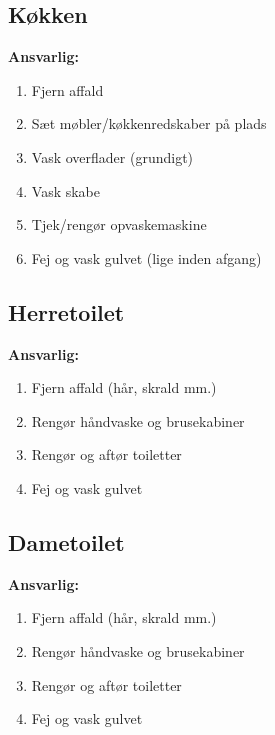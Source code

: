 \subsection{Køkken}
\textbf{Ansvarlig: \Hyttebombz}
\begin{multicols}{2}
\begin{enumerate}
  \item Fjern affald
  \item Sæt møbler/køkkenredskaber på plads
  \item Vask overflader (grundigt)
  \item Vask skabe
  \item Tjek/rengør opvaskemaskine
  \item Fej og vask gulvet (lige inden afgang)
\end{enumerate}
\end{multicols}

\subsection{Herretoilet}
\textbf{Ansvarlig: \YOLO}\\
\begin{multicols}{2}
\begin{enumerate}
  \item Fjern affald (hår, skrald mm.)
  \item Rengør håndvaske og brusekabiner
  \item Rengør og aftør toiletter
  \item Fej og vask gulvet
\end{enumerate}
\end{multicols}

\subsection{Dametoilet}
\textbf{Ansvarlig: \Johnny}
\begin{multicols}{2}
\begin{enumerate}
  \item Fjern affald (hår, skrald mm.)
  \item Rengør håndvaske og brusekabiner
  \item Rengør og aftør toiletter
  \item Fej og vask gulvet
\end{enumerate}
\end{multicols}

